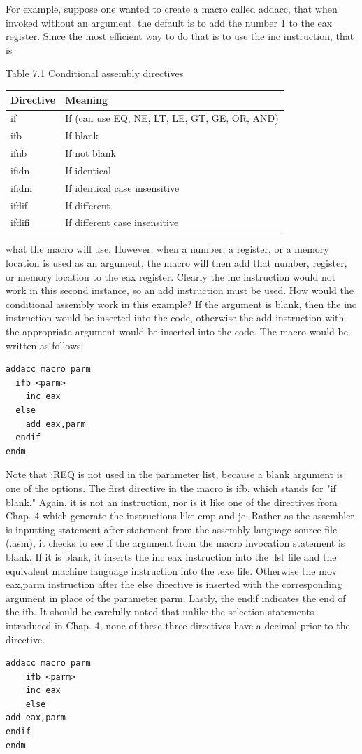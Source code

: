 \documentclass[10pt]{book}
\begin{document}
For example, suppose one wanted to create a macro called addacc, that when invoked without an argument, the default is to add the number 1 to the eax register. Since the most efficient way to do that is to use the inc instruction, that is

Table 7.1 Conditional assembly directives
\begin{center}
\begin{tabular}{ll}
\hline
\textbf{Directive} & \textbf{Meaning} \\
\hline
if & If (can use EQ, NE, LT, LE, GT, GE, OR, AND) \\
ifb & If blank \\
ifnb & If not blank \\
ifidn & If identical \\
ifidni & If identical case insensitive \\
ifdif & If different \\
ifdifi & If different case insensitive \\
\hline
\end{tabular}
\end{center}

what the macro will use. However, when a number, a register, or a memory location is used as an argument, the macro will then add that number, register, or memory location to the eax register. Clearly the inc instruction would not work in this second instance, so an add instruction must be used. How would the conditional assembly work in this example? If the argument is blank, then the inc instruction would be inserted into the code, otherwise the add instruction with the appropriate argument would be inserted into the code. The macro would be written as follows:

\begin{verbatim}
addacc macro parm
  ifb <parm>
    inc eax
  else
    add eax,parm
  endif
endm
\end{verbatim}

Note that :REQ is not used in the parameter list, because a blank argument is one of the options. The first directive in the macro is ifb, which stands for "if blank." Again, it is not an instruction, nor is it like one of the directives from Chap. 4 which generate the instructions like cmp and je. Rather as the assembler is inputting statement after statement from the assembly language source file (.asm), it checks to see if the argument from the macro invocation statement is blank. If it is blank, it inserts the inc eax instruction into the .lst file and the equivalent machine language instruction into the .exe file. Otherwise the mov eax,parm instruction after the else directive is inserted with the corresponding argument in place of the parameter parm. Lastly, the endif indicates the end of the ifb. It should be carefully noted that unlike the selection statements introduced in Chap. 4, none of these three directives have a decimal prior to the directive.
\begin{verbatim}
addacc macro parm
    ifb <parm>
    inc eax
    else
add eax,parm
endif
endm
\end{verbatim}
\end{document}
